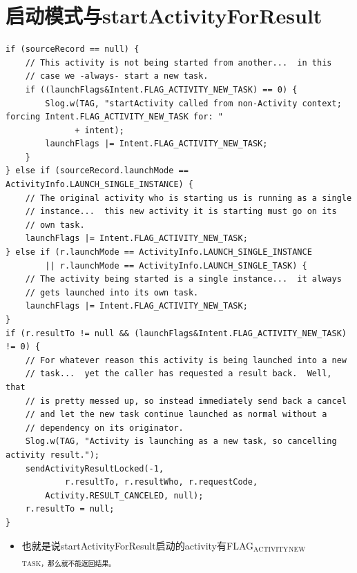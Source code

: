 \documentclass[9pt, b5paaper]{book}
\begin{document}
\section{启动模式与startActivityForResult}
\label{sec-4-7}
\begin{verbatim}
if (sourceRecord == null) {
    // This activity is not being started from another...  in this
    // case we -always- start a new task.
    if ((launchFlags&Intent.FLAG_ACTIVITY_NEW_TASK) == 0) {
        Slog.w(TAG, "startActivity called from non-Activity context; forcing Intent.FLAG_ACTIVITY_NEW_TASK for: "
              + intent);
        launchFlags |= Intent.FLAG_ACTIVITY_NEW_TASK;
    }
} else if (sourceRecord.launchMode == ActivityInfo.LAUNCH_SINGLE_INSTANCE) {
    // The original activity who is starting us is running as a single
    // instance...  this new activity it is starting must go on its
    // own task.
    launchFlags |= Intent.FLAG_ACTIVITY_NEW_TASK;
} else if (r.launchMode == ActivityInfo.LAUNCH_SINGLE_INSTANCE
        || r.launchMode == ActivityInfo.LAUNCH_SINGLE_TASK) {
    // The activity being started is a single instance...  it always
    // gets launched into its own task.
    launchFlags |= Intent.FLAG_ACTIVITY_NEW_TASK;
}
if (r.resultTo != null && (launchFlags&Intent.FLAG_ACTIVITY_NEW_TASK) != 0) {
    // For whatever reason this activity is being launched into a new
    // task...  yet the caller has requested a result back.  Well, that
    // is pretty messed up, so instead immediately send back a cancel
    // and let the new task continue launched as normal without a
    // dependency on its originator.
    Slog.w(TAG, "Activity is launching as a new task, so cancelling activity result.");
    sendActivityResultLocked(-1,
            r.resultTo, r.resultWho, r.requestCode,
        Activity.RESULT_CANCELED, null);
    r.resultTo = null;
}
\end{verbatim}
\begin{itemize}
\item 也就是说startActivityForResult启动的activity有FLAG$_{\text{ACTIVITY}}$$_{\text{NEW}}$$_{\text{TASK，那么就不能返回结果。}}$
\end{itemize}
\end{document}
